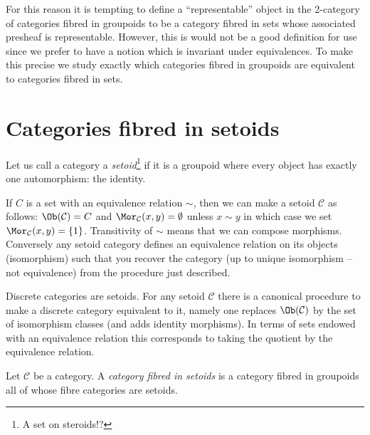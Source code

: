 \noindent
For this reason it is tempting to define a ``representable'' object in the
2-category of categories fibred in groupoids to be a category fibred in
sets whose associated presheaf is representable. However, this is would not
be a good definition for use since we prefer to have a notion which is
invariant under equivalences. To make this precise we study exactly
which categories fibred in groupoids are equivalent to categories
fibred in sets.









\section{Categories fibred in setoids}
\label{section-fibred-in-setoids}

\begin{definition}
\label{definition-setoid}
Let us call a category a {\it setoid}\footnote{A set on steroids!?}
if it is a groupoid where every object
has exactly one automorphism: the identity.
\end{definition}

\noindent
If $C$ is a set with an equivalence relation $\sim$, then we can make a setoid
$\mathcal{C}$ as follows: $\Ob(\mathcal{C}) = C$ and
$\Mor_\mathcal{C}(x, y) = \emptyset$ unless $x \sim y$ in which
case we set $\Mor_\mathcal{C}(x, y) = \{1\}$. Transitivity of
$\sim$ means that we can compose morphisms. Conversely any setoid
category defines an equivalence relation on its objects (isomorphism)
such that you recover the category (up to unique isomorphism -- not
equivalence) from the procedure just described.

\medskip\noindent
Discrete categories are setoids. For any setoid $\mathcal{C}$ there is a
canonical procedure to make a discrete category equivalent to it, namely
one replaces $\Ob(\mathcal{C})$ by the set of isomorphism
classes (and adds identity morphisms). In terms of sets endowed
with an equivalence relation this corresponds to taking the quotient
by the equivalence relation.

\begin{definition}
\label{definition-category-fibred-setoids}
Let $\mathcal{C}$ be a category. A {\it category fibred in setoids}
is a category fibred in groupoids all of whose fibre categories are
setoids.
\end{definition}


